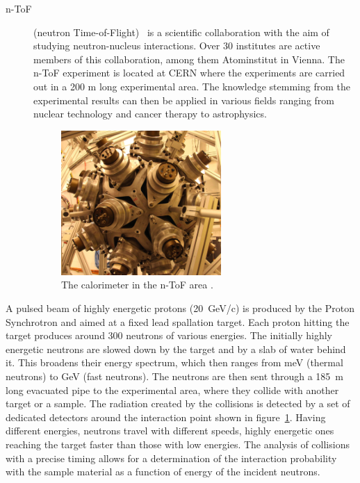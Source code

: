 \begin{description}
\item[n-ToF] (neutron Time-of-Flight)~\cite{NTOF:00000} is a scientific collaboration with the aim of studying neutron-nucleus interactions. Over 30 institutes are active members of this collaboration, among them Atominstitut in Vienna. The n-ToF experiment is located at CERN where the experiments are carried out in a 200 m long experimental area. The knowledge stemming from the experimental results can then be applied in various fields ranging from nuclear technology and cancer therapy to astrophysics.
\begin{figure}[!t]
\centering
\includegraphics[width=0.6\textwidth]{01_introduction/pics/ntof}
\caption{The calorimeter in the n-ToF area \cite{Maximilien:1304589}.}
\label{fig:ntof}
\end{figure}
\end{description}
A pulsed beam of highly energetic protons (20~GeV/c) is produced by the Proton Synchrotron and aimed at a fixed lead spallation target. Each proton hitting the target produces around 300 neutrons of various energies. The initially highly energetic neutrons are slowed down by the target and by a slab of water behind it. This broadens their energy spectrum, which then ranges from meV (thermal neutrons) to GeV (fast neutrons). The neutrons are then sent through a 185~m long evacuated pipe to the experimental area, where they collide with another target or a sample. The radiation created by the collisions is detected by a set of dedicated detectors around the interaction point shown in figure~\ref{fig:ntof}. Having different energies, neutrons travel with different speeds, highly energetic ones reaching the target faster than those with low energies. The analysis of collisions with a precise timing allows for a determination of the interaction probability with the sample material as a function of energy of the incident neutrons.






